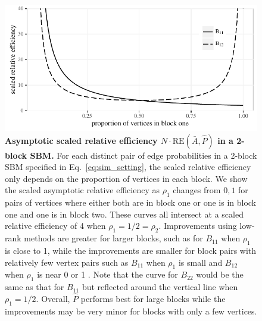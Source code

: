 \documentclass[10pt,letterpaper]{article}
\renewcommand{\hat}{\widehat}
\begin{document}
\begin{figure}[!t]
\centering
\includegraphics[width=1\textwidth]{Rho.pdf}
\caption{{\bf Asymptotic scaled relative efficiency $N\cdot \mathrm{RE}(\bar{A},\hat{P})$ in a 2-block SBM.}
For each distinct pair of edge probabilities in a 2-block SBM specified in Eq.~\ref{eq:sim_setting}, the scaled relative efficiency only depends on the proportion of vertices in each block.
We show the scaled asymptotic relative efficiency as $\rho_1$ changes from $0,1$ for pairs of vertices where either both are in block one or one is in block one and one is in block two. 
These curves all intersect at a scaled relative efficiency of 4 when $\rho_1=1/2=\rho_2$.
Improvements using low-rank methods are greater for larger blocks, such as for $B_{11}$ when $\rho_1$ is close to 1, while the improvements are smaller for block pairs with relatively few vertex pairs such as $B_{11}$ when $\rho_1$ is small and $B_{12}$ when $\rho_1$ is near 0 or 1
.
Note that the curve for $B_{22}$ would be the same as that for $B_{11}$ but reflected around the vertical line when $\rho_1=1/2$.
Overall, $\hat{P}$ performs best for large blocks while the improvements may be very minor for blocks with only a few vertices.
}
\label{fig:RErho}
\end{figure}
\end{document}

